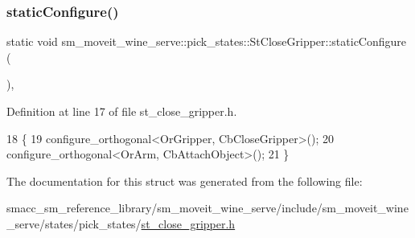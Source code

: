 \subsubsection{\texorpdfstring{static\+Configure()}{staticConfigure()}}
{\footnotesize\ttfamily static void sm\+\_\+moveit\+\_\+wine\+\_\+serve\+::pick\+\_\+states\+::\+St\+Close\+Gripper\+::static\+Configure (\begin{DoxyParamCaption}{ }\end{DoxyParamCaption})\hspace{0.3cm}{\ttfamily [inline]}, {\ttfamily [static]}}



Definition at line 17 of file st\+\_\+close\+\_\+gripper.\+h.


\begin{DoxyCode}
18          \{
19             configure\_orthogonal<OrGripper, CbCloseGripper>();
20             configure\_orthogonal<OrArm, CbAttachObject>();
21          \}
\end{DoxyCode}


The documentation for this struct was generated from the following file\+:\begin{DoxyCompactItemize}
\item 
smacc\+\_\+sm\+\_\+reference\+\_\+library/sm\+\_\+moveit\+\_\+wine\+\_\+serve/include/sm\+\_\+moveit\+\_\+wine\+\_\+serve/states/pick\+\_\+states/\hyperlink{sm__moveit__wine__serve_2include_2sm__moveit__wine__serve_2states_2pick__states_2st__close__gripper_8h}{st\+\_\+close\+\_\+gripper.\+h}\end{DoxyCompactItemize}
